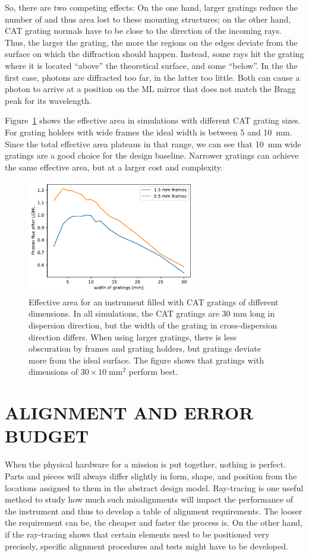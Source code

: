 \documentclass[]{spie}  %
\begin{document}
So, there are two competing effects: On the one hand, larger gratings
reduce the number of and thus area lost to these mounting structures;
on the other hand, CAT grating
normals have to be close to the direction of the incoming rays. Thus, the
larger the grating, the more the regions on the edges deviate from
the surface on which the diffraction should happen. Instead, some rays
hit the grating where it is located ``above'' the theoretical surface,
and some ``below''. In the the first case, photons are diffracted too
far, in the latter too little. Both can cause a photon to arrive
at a position on the
ML mirror that does not match the Bragg peak for its
wavelength.

Figure~\ref{fig:width} shows the effective area in simulations with
different CAT grating sizes. For grating holders with wide frames the
ideal width is between 5 and 10~mm. Since the total effective area
plateaus in that range, we can see that 10~mm wide gratings are a good
choice for the design baseline. Narrower gratings can achieve the same
effective area, but at a larger cost and complexity.
\begin{figure} [ht]
  \begin{center}
    \includegraphics[height=5cm]{catdimensions.pdf}
  \end{center}
  \caption
      { \label{fig:width}Effective area for an instrument filled with
        CAT gratings of different dimensions. In all simulations, the
        CAT gratings are 30 mm long in dispersion direction, but the
        width of the grating in cross-dispersion direction
        differs. When using larger gratings, there is less obscuration
        by frames and grating holders, but gratings deviate more from
        the ideal surface. The figure shows that gratings with
        dimensions of $30\times10\;\mathrm{mm}^2$ perform best.  }
\end{figure}

\section{ALIGNMENT AND ERROR BUDGET}
\label{sect:align}
When the physical hardware for a mission is put together, nothing is
perfect. Parts and pieces will always differ slightly in form, shape,
and position from the locations assigned to them in the abstract
design model. Ray-tracing is one useful method to study how much such
misalignments will impact the performance of the instrument and thus
to develop a table of alignment requirements. The looser the
requirement can be, the cheaper and faster the process is. On the
other hand, if the ray-tracing shows that certain elements need to be
positioned very precisely, specific alignment procedures and tests
might have to be developed.
\end{document}

